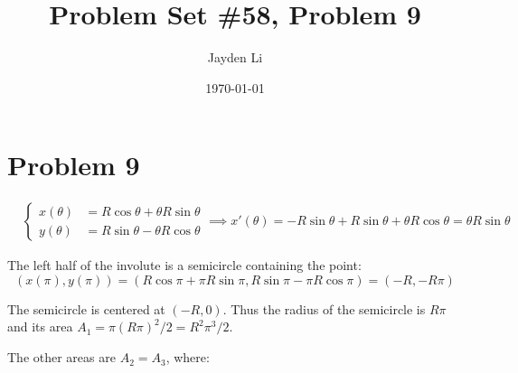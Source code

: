 \documentclass[preview, margin=0.6in]{standalone}
\title{\vspace*{-40pt}Problem Set \#58, Problem 9}
\author{Jayden Li}
\date{\today}
\newcommand*{\problem}[1]{\section*{Problem #1}}
\begin{document}
\fontsize{12pt}{12pt}\selectfont
\setlength{\abovedisplayskip}{\abovedisplayskip/2}
\setlength{\belowdisplayskip}{\belowdisplayskip/2}
\setlength{\parindent}{0pt}
\setlength{\parskip}{2ex plus 0.5ex minus 0.2ex}
\maketitle

\problem{9}
\begin{align*}
	&\left\{\begin{aligned}
		x(\theta)&=R\cos \theta+\theta R\sin \theta \\
		y(\theta)&=R\sin \theta-\theta R\cos \theta
	\end{aligned}\right.
	\implies
	x'(\theta)
	=-R\sin \theta+R\sin \theta+\theta R\cos \theta
	=\theta R\sin \theta
\end{align*}

The left half of the involute is a semicircle containing the point:
\begin{equation*}
	(x(\pi),y(\pi))
	=\left(R\cos \pi+\pi R\sin \pi, R\sin \pi-\pi R\cos \pi\right)
	=\left(-R, -R\pi\right)
\end{equation*}

The semicircle is centered at $(-R, 0)$. Thus the radius of the semicircle is $R\pi$ and its area $A_1=\pi \left(R\pi\right)^2/2=R^2\pi^3/2$.

The other areas are $A_2=A_3$, where:
\end{document}
